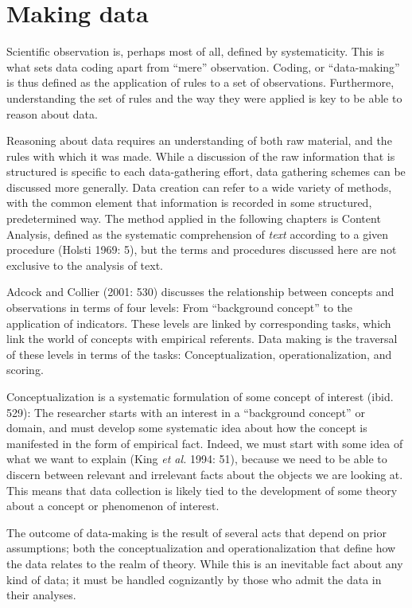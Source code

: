 \documentclass[12pt,twoside]{reedthesis}
\begin{document}
\section{Making data}\label{making-data}

Scientific observation is, perhaps most of all, defined by
systematicity. This is what sets data coding apart from ``mere''
observation. Coding, or ``data-making'' is thus defined as the
application of rules to a set of observations. Furthermore,
understanding the set of rules and the way they were applied is key to
be able to reason about data.

Reasoning about data requires an understanding of both raw material, and
the rules with which it was made. While a discussion of the raw
information that is structured is specific to each data-gathering
effort, data gathering schemes can be discussed more generally. Data
creation can refer to a wide variety of methods, with the common element
that information is recorded in some structured, predetermined way. The
method applied in the following chapters is Content Analysis, defined as
the systematic comprehension of \emph{text} according to a given
procedure (Holsti 1969: 5), but the terms and procedures discussed here
are not exclusive to the analysis of text.

Adcock and Collier (2001: 530) discusses the relationship between
concepts and observations in terms of four levels: From ``background
concept'' to the application of indicators. These levels are linked by
corresponding tasks, which link the world of concepts with empirical
referents. Data making is the traversal of these levels in terms of the
tasks: Conceptualization, operationalization, and scoring.

Conceptualization is a systematic formulation of some concept of
interest (ibid. 529): The researcher starts with an interest in a
``background concept'' or domain, and must develop some systematic idea
about how the concept is manifested in the form of empirical fact.
Indeed, we must start with some idea of what we want to explain (King
\emph{et al.} 1994: 51), because we need to be able to discern between
relevant and irrelevant facts about the objects we are looking at. This
means that data collection is likely tied to the development of some
theory about a concept or phenomenon of interest.

The outcome of data-making is the result of several acts that depend on
prior assumptions; both the conceptualization and operationalization
that define how the data relates to the realm of theory. While this is
an inevitable fact about any kind of data; it must be handled
cognizantly by those who admit the data in their analyses.
\end{document}
